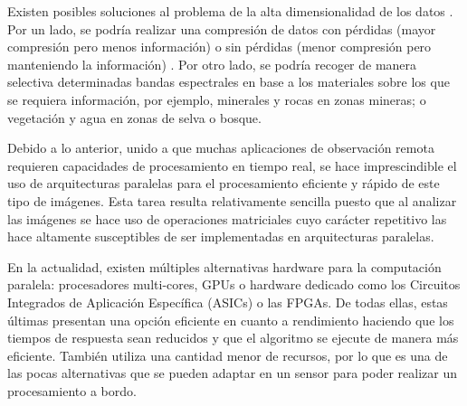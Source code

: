 Existen posibles soluciones al problema de la alta dimensionalidad de los datos \cite{biblio:reducir_dimensiones}. Por un lado, se podría realizar una compresión de datos con pérdidas (mayor compresión pero menos información) o sin pérdidas (menor compresión pero manteniendo la información) \cite{biblio:compresion}. Por otro lado, se podría recoger de manera selectiva determinadas bandas espectrales en base a los materiales sobre los que se requiera información, por ejemplo, minerales y rocas en zonas mineras; o vegetación y agua en zonas de selva o bosque.

Debido a lo anterior, unido a que muchas aplicaciones de observación remota requieren capacidades de procesamiento en tiempo real, se hace imprescindible el uso de arquitecturas paralelas para el procesamiento eficiente y rápido de este tipo de imágenes. Esta tarea resulta relativamente sencilla puesto que al analizar las imágenes se hace uso de operaciones matriciales cuyo carácter repetitivo las hace altamente susceptibles de ser implementadas en arquitecturas paralelas.

En la actualidad, existen múltiples alternativas hardware para la computación paralela: procesadores multi-cores, GPUs o hardware dedicado como los Circuitos Integrados de Aplicación Específica (ASICs) o las FPGAs. De todas ellas, estas últimas presentan una opción eficiente en cuanto a rendimiento haciendo que los tiempos de respuesta sean reducidos y que el algoritmo se ejecute de manera más eficiente. También utiliza una cantidad menor de recursos, por lo que es una de las pocas alternativas que se pueden adaptar en un sensor para poder realizar un procesamiento a bordo.